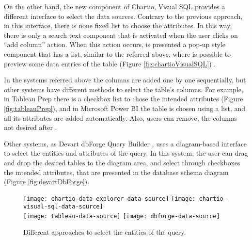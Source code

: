 On the other hand, the new component of Chartio, Visual SQL provides a different interface to select the data sources. Contrary to the previous approach, in this interface, there is none fixed list to choose the attributes. In this way, there is only a search text component that is activated when the user clicks on “add column” action. When this action occurs, is presented a pop-up style component that has a list, similar to the referred above, where is possible to preview some data entries of the table (Figure \ref{fig:chartioVisualSQL}) \cite{chartioVisualSQL}. 

In the systems referred above the columns are added one by one sequentially, but other systems have different methods to select the table’s columns. For example, in Tableau Prep \cite{tableauPrep} there is a checkbox list to chose the intended attributes (Figure \ref{fig:tableauPrep}), and in Microsoft Power BI \cite{powerBI} the table is chosen using a list, and all its attributes are added automatically. Also, users can remove, the columns not desired after \cite{tableauPrepHelpWhatsNew} \cite{powerBIShapeAndCombineData}.

Other systems, as Devart dbForge Query Builder \cite{dbForgeQueryBuilder}, uses a diagram-based interface to select the entities and attributes of the query. In this system, the user can drag and drop the desired tables to the diagram area, and select through checkboxes the intended attributes, that are presented in the database schema diagram (Figure \ref{fig:devartDbForge}).


\begin{figure}[htbp]
    \centering
      {\texttt{[image: chartio-data-explorer-data-source]}}%
      {\texttt{[image: chartio-visual-sql-data-source]}}%
      \\
    {\texttt{[image: tableau-data-source]}}%
    {\texttt{[image: dbforge-data-source]}}%
  \caption{Different approaches to select the entities of the query.}
    \label{fig:approaches_select_data_sources}
  \end{figure}

